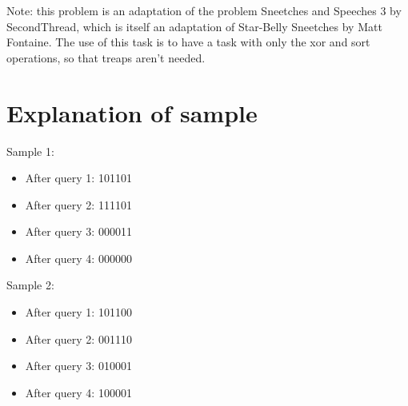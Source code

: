 Note: this problem is an adaptation of the problem Sneetches and Speeches 3 by SecondThread, which is itself
an adaptation of Star-Belly Sneetches by Matt Fontaine. The use of this task is to have a task with only the
xor and sort operations, so that treaps aren't needed.

\section*{Explanation of sample}
Sample 1:
\begin{itemize}
  \item After query 1: 101101
  \item After query 2: 111101
  \item After query 3: 000011
  \item After query 4: 000000
\end{itemize}


Sample 2:
\begin{itemize}
  \item After query 1: 101100
  \item After query 2: 001110
  \item After query 3: 010001
  \item After query 4: 100001
\end{itemize}
